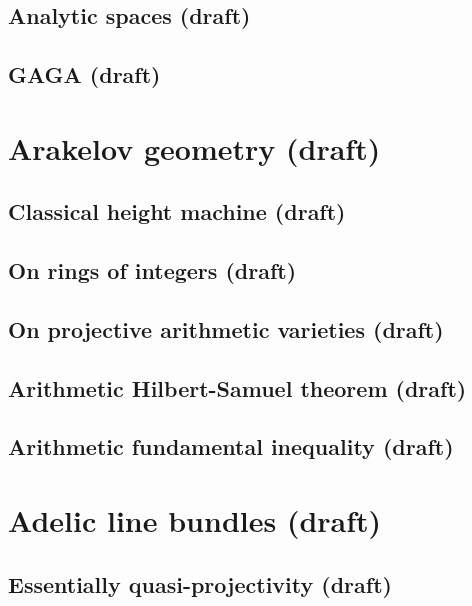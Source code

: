 \documentclass[sectionlevel=book]{noteformyself}
\begin{document}
        \section{Analytic spaces (draft)}
        
        \section{GAGA (draft)}
        

    \chapter{Arakelov geometry (draft)}
        \section{Classical height machine (draft)}
        
        \section{On rings of integers (draft)}
        
        \section{On projective arithmetic varieties (draft)}
        
        \section{Arithmetic Hilbert-Samuel theorem (draft)}
        
        \section{Arithmetic fundamental inequality (draft)}
        

    \chapter{Adelic line bundles (draft)}
        \section{Essentially quasi-projectivity (draft)}
        
\end{document}
